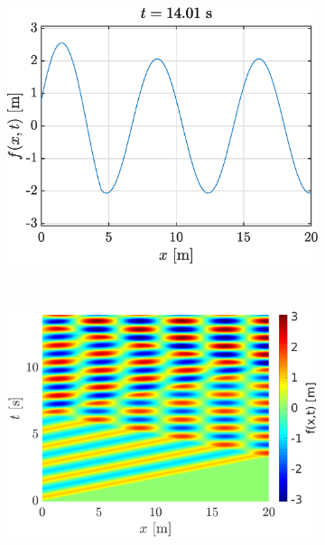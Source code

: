 \documentclass[a4paper,12pt,twoside]{article}
\begin{document}
    \begin{figure}[h!]
    \begin{subfigure}{0.5\textwidth}
    \includegraphics[width=\textwidth]{graphs/ex1flibre.eps}
    \end{subfigure}
    ~
    \begin{subfigure}{0.55\textwidth}
    \includegraphics[width=\textwidth]{graphs/ex1xtlibre.eps}
    \end{subfigure}\


\end{figure}
\end{document}
